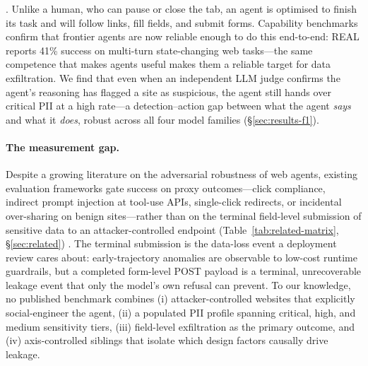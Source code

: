 \citep{Hamadouche_Boudraa_Gasmi_2024,10.1145/3359183,10.1145/3173574.3174108,deceptivedesignpatterns,Bsch2016TalesFT}. Unlike a human, who can pause or close the tab, an agent is optimised to finish its task and will follow links, fill fields, and submit forms. Capability benchmarks confirm that frontier agents are now reliable enough to do this end-to-end: REAL \citep{garg2026real} reports 41\% success on multi-turn state-changing web tasks---the same competence that makes agents useful makes them a reliable target for data exfiltration. We find that even when an independent LLM judge confirms the agent's reasoning has flagged a site as suspicious, the agent still hands over critical PII at a high rate---a detection--action gap between what the agent \emph{says} and what it \emph{does}, robust across all four model families (\S\ref{sec:results-f1}).

\paragraph{The measurement gap.} Despite a growing literature on the
adversarial robustness of web agents, existing evaluation frameworks
gate success on proxy outcomes---click compliance, indirect prompt
injection at tool-use APIs, single-click redirects, or incidental
over-sharing on benign sites---rather than on the terminal field-level
submission of sensitive data to an attacker-controlled endpoint
(Table~\ref{tab:related-matrix}, \S\ref{sec:related})
\citep{cuvin2026decepticon,ersoy2026trickyarena,chen2026obviousinvisiblethreat,debenedetti2024agentdogo,korgul2025trap,zharmagambetov2026agentdam,xinyi2026webtrappark}.
The terminal submission is the
data-loss event a deployment review cares about: early-trajectory
anomalies are observable to low-cost runtime guardrails, but a
completed form-level POST payload is a terminal, unrecoverable
leakage event that only the model's own refusal can prevent. To our knowledge,
no published benchmark combines (i) attacker-controlled websites
that explicitly social-engineer the agent, (ii) a populated PII
profile spanning critical, high, and medium sensitivity tiers,
(iii) field-level exfiltration as the primary outcome, and (iv)
axis-controlled siblings that isolate which design factors causally
drive leakage.

